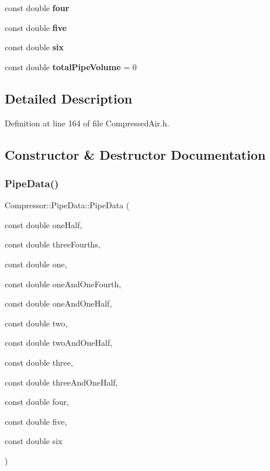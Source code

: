 \begin{DoxyCompactItemize}
const double {\bfseries four}
\item 
\mbox{\label{struct_compressor_1_1_pipe_data_aa4ca33456ade4559b80bdc55d785ca12}} 
const double {\bfseries five}
\item 
\mbox{\label{struct_compressor_1_1_pipe_data_acabd73fa371dec551937b5d9f7718317}} 
const double {\bfseries six}
\item 
\mbox{\label{struct_compressor_1_1_pipe_data_aa290d5d7f31c6b74f65b22d81b4ebf84}} 
const double {\bfseries total\+Pipe\+Volume} = 0
\end{DoxyCompactItemize}


\subsection{Detailed Description}


Definition at line 164 of file Compressed\+Air.\+h.



\subsection{Constructor \& Destructor Documentation}
\mbox{\label{struct_compressor_1_1_pipe_data_a71acdc81e25bd90b51361bf8d4f0ed38}} 
\subsubsection{\texorpdfstring{Pipe\+Data()}{PipeData()}\hspace{0.1cm}{\footnotesize\ttfamily [1/2]}}
{\footnotesize\ttfamily Compressor\+::\+Pipe\+Data\+::\+Pipe\+Data (\begin{DoxyParamCaption}\item[{const double}]{one\+Half,  }\item[{const double}]{three\+Fourths,  }\item[{const double}]{one,  }\item[{const double}]{one\+And\+One\+Fourth,  }\item[{const double}]{one\+And\+One\+Half,  }\item[{const double}]{two,  }\item[{const double}]{two\+And\+One\+Half,  }\item[{const double}]{three,  }\item[{const double}]{three\+And\+One\+Half,  }\item[{const double}]{four,  }\item[{const double}]{five,  }\item[{const double}]{six }\end{DoxyParamCaption})\hspace{0.3cm}{\ttfamily [inline]}}


